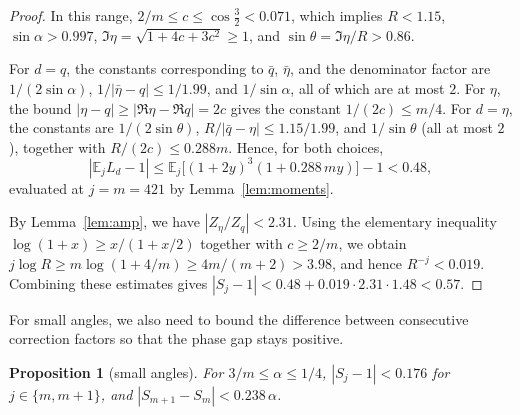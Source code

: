 \documentclass[11pt]{amsart}
\newtheorem{proposition}[theorem]{Proposition}
\theoremstyle{remark}
\newcommand{\E}{\mathbb{E}}
\begin{document}
\begin{proof}
In this range, $2/m\le c\le\cos\frac32<0.071$, which implies $R<1.15$,
$\sin\alpha>0.997$, $\Im\eta=\sqrt{1+4c+3c^2}\ge1$, and
$\sin\theta=\Im\eta/R>0.86$.

For $d=q$, the constants corresponding to $\bar q$, $\bar\eta$, and the
denominator factor are $1/(2\sin\alpha)$, $1/|\bar\eta-q|\le1/1.99$, and
$1/\sin\alpha$, all of which are at most $2$. For $\eta$, the bound
$|\eta-q|\ge|\Re\eta-\Re q|=2c$ gives the constant $1/(2c)\le m/4$. For
$d=\eta$, the constants are $1/(2\sin\theta)$,
$R/|\bar q-\eta|\le1.15/1.99$, and $1/\sin\theta$ (all at most $2$),
together with $R/(2c)\le0.288m$. Hence, for both choices,
\[
 |\E_jL_d-1|\le\E_j\bigl[(1+2y)^3(1+0.288\,my)\bigr]-1<0.48,
\]
evaluated at $j=m=421$ by Lemma~\ref{lem:moments}.

By Lemma~\ref{lem:amp}, we have $|Z_\eta/Z_q|<2.31$. Using the elementary
inequality $\log(1+x)\ge x/(1+x/2)$ together with $c\ge2/m$, we obtain
$j\log R\ge m\log(1+4/m)\ge4m/(m+2)>3.98$, and hence $R^{-j}<0.019$.
Combining these estimates gives
$|S_j-1|<0.48+0.019\cdot2.31\cdot1.48<0.57$.
\end{proof}

For small angles, we also need to bound the difference between consecutive
correction factors so that the phase gap stays positive.

\begin{proposition}[small angles]\label{prop:small}
For $3/m\le\alpha\le1/4$, $|S_j-1|<0.176$ for $j\in\{m,m+1\}$, and
$|S_{m+1}-S_m|<0.238\,\alpha$.
\end{proposition}
\end{document}
